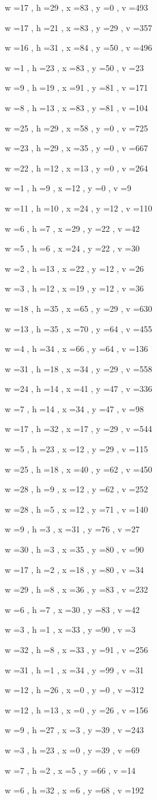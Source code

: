 \documentclass[11pt]{article}
\begin{document}
w =17 , h =29 , x =83 , y =0 , v =493
\par
w =17 , h =21 , x =83 , y =29 , v =357
\par
w =16 , h =31 , x =84 , y =50 , v =496
\par
w =1 , h =23 , x =83 , y =50 , v =23
\par
w =9 , h =19 , x =91 , y =81 , v =171
\par
w =8 , h =13 , x =83 , y =81 , v =104
\par
w =25 , h =29 , x =58 , y =0 , v =725
\par
w =23 , h =29 , x =35 , y =0 , v =667
\par
w =22 , h =12 , x =13 , y =0 , v =264
\par
w =1 , h =9 , x =12 , y =0 , v =9
\par
w =11 , h =10 , x =24 , y =12 , v =110
\par
w =6 , h =7 , x =29 , y =22 , v =42
\par
w =5 , h =6 , x =24 , y =22 , v =30
\par
w =2 , h =13 , x =22 , y =12 , v =26
\par
w =3 , h =12 , x =19 , y =12 , v =36
\par
w =18 , h =35 , x =65 , y =29 , v =630
\par
w =13 , h =35 , x =70 , y =64 , v =455
\par
w =4 , h =34 , x =66 , y =64 , v =136
\par
w =31 , h =18 , x =34 , y =29 , v =558
\par
w =24 , h =14 , x =41 , y =47 , v =336
\par
w =7 , h =14 , x =34 , y =47 , v =98
\par
w =17 , h =32 , x =17 , y =29 , v =544
\par
w =5 , h =23 , x =12 , y =29 , v =115
\par
w =25 , h =18 , x =40 , y =62 , v =450
\par
w =28 , h =9 , x =12 , y =62 , v =252
\par
w =28 , h =5 , x =12 , y =71 , v =140
\par
w =9 , h =3 , x =31 , y =76 , v =27
\par
w =30 , h =3 , x =35 , y =80 , v =90
\par
w =17 , h =2 , x =18 , y =80 , v =34
\par
w =29 , h =8 , x =36 , y =83 , v =232
\par
w =6 , h =7 , x =30 , y =83 , v =42
\par
w =3 , h =1 , x =33 , y =90 , v =3
\par
w =32 , h =8 , x =33 , y =91 , v =256
\par
w =31 , h =1 , x =34 , y =99 , v =31
\par
w =12 , h =26 , x =0 , y =0 , v =312
\par
w =12 , h =13 , x =0 , y =26 , v =156
\par
w =9 , h =27 , x =3 , y =39 , v =243
\par
w =3 , h =23 , x =0 , y =39 , v =69
\par
w =7 , h =2 , x =5 , y =66 , v =14
\par
w =6 , h =32 , x =6 , y =68 , v =192
\par
\newpage
\end{document}

